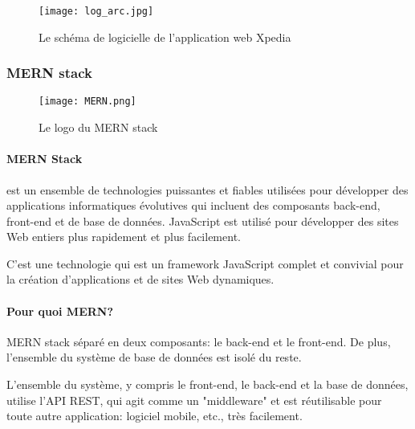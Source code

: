     \begin{figure}[H]
        \centering
        \texttt{[image: log\_arc.jpg]}
        \caption{Le schéma de logicielle de l'application web Xpedia}\label{fig:log_arc}
    \end{figure}

    \subsubsection{MERN stack}
    \begin{figure}[H]
        \centering
        \texttt{[image: MERN.png]}
        \caption{Le logo du MERN stack}\label{fig:mern}
    \end{figure}
    \paragraph{MERN Stack} est un ensemble de technologies puissantes et fiables utilisées pour développer des applications informatiques évolutives qui incluent des composants back-end, front-end et de base de données. JavaScript est utilisé pour développer des sites Web entiers plus rapidement et plus facilement.

    C'est une technologie qui est un framework JavaScript complet et convivial pour la création d'applications et de sites Web dynamiques.

    \paragraph{Pour quoi MERN?}MERN stack séparé en deux composants: le back-end et le front-end. De plus, l'ensemble du système de base de données est isolé du reste.

    L'ensemble du système, y compris le front-end, le back-end et la base de données, utilise l'API REST, qui agit comme un "middleware" et est réutilisable pour toute autre application: logiciel mobile, etc., très facilement.

